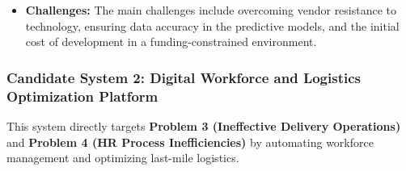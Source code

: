 \documentclass[12pt,a4paper]{article}
\begin{document}
\begin{itemize}
\begin{itemize}
        \item \textbf{Annual Maintenance:}  Approximately 15 Lakh BDT.
        \item \textbf{Projected Savings:}  Expected to reduce product spoilage by 50\% and procurement costs by 10-15\% through direct sourcing, leading to annual savings of approximately 60-70 Lakh BDT.
        \item \textbf{Break-Even:}  Around 1.5 years.
        \item \textbf{Return on Investment (ROI):}  Estimated at 200\% within 3 years post-implementation.
    \end{itemize}
    \item \textbf{Challenges:} The main challenges include overcoming vendor resistance to technology, ensuring data accuracy in the predictive models, and the initial cost of development in a funding-constrained environment.
\end{itemize}

\subsubsection{Candidate System 2: Digital Workforce and Logistics Optimization Platform}
This system directly targets \textbf{Problem 3 (Ineffective Delivery Operations)} and \textbf{Problem 4 (HR Process Inefficiencies)} by automating workforce management and optimizing last-mile logistics.
\end{document}
